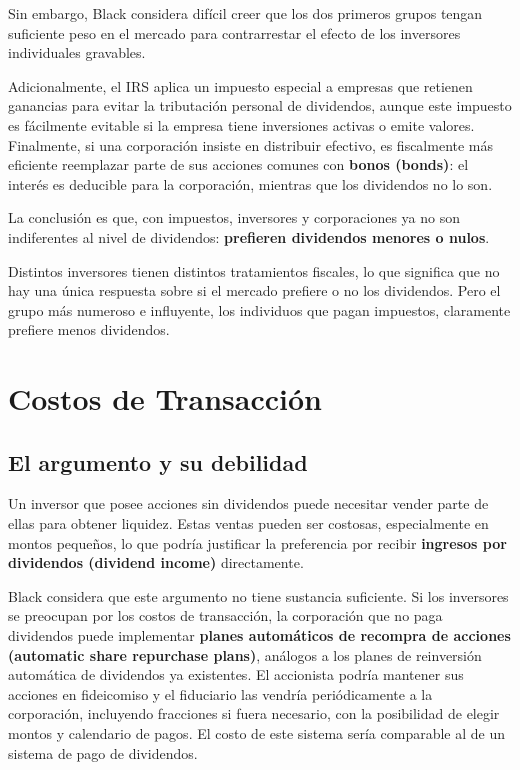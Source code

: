 \documentclass[12pt]{article}
\begin{document}
Sin embargo, Black considera dif\'icil creer que los dos primeros grupos tengan suficiente peso en el mercado para contrarrestar el efecto de los inversores individuales gravables.

Adicionalmente, el IRS aplica un impuesto especial a empresas que retienen ganancias para evitar la tributaci\'on personal de dividendos, aunque este impuesto es f\'acilmente evitable si la empresa tiene inversiones activas o emite valores. Finalmente, si una corporaci\'on insiste en distribuir efectivo, es fiscalmente m\'as eficiente reemplazar parte de sus acciones comunes con \textbf{bonos (bonds)}: el inter\'es es deducible para la corporaci\'on, mientras que los dividendos no lo son.

La conclusi\'on es que, con impuestos, inversores y corporaciones ya no son indiferentes al nivel de dividendos: \textbf{prefieren dividendos menores o nulos}.

\begin{intuicion}
Distintos inversores tienen distintos tratamientos fiscales, lo que significa que no hay una \'unica respuesta sobre si el mercado prefiere o no los dividendos. Pero el grupo m\'as numeroso e influyente, los individuos que pagan impuestos, claramente prefiere menos dividendos.
\end{intuicion}

\section{Costos de Transacci\'on}

\subsection{El argumento y su debilidad}

Un inversor que posee acciones sin dividendos puede necesitar vender parte de ellas para obtener liquidez. Estas ventas pueden ser costosas, especialmente en montos peque\~nos, lo que podr\'ia justificar la preferencia por recibir \textbf{ingresos por dividendos (dividend income)} directamente.

Black considera que este argumento no tiene sustancia suficiente. Si los inversores se preocupan por los costos de transacci\'on, la corporaci\'on que no paga dividendos puede implementar \textbf{planes autom\'aticos de recompra de acciones (automatic share repurchase plans)}, an\'alogos a los planes de reinversi\'on autom\'atica de dividendos ya existentes. El accionista podr\'ia mantener sus acciones en fideicomiso y el fiduciario las vendr\'ia peri\'odicamente a la corporaci\'on, incluyendo fracciones si fuera necesario, con la posibilidad de elegir montos y calendario de pagos. El costo de este sistema ser\'ia comparable al de un sistema de pago de dividendos.
\end{document}
